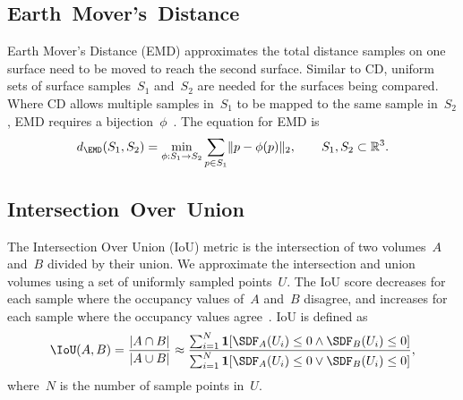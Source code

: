 \subsection{Earth~Mover's~Distance}
\label{subsec:earth_movers_distance}

Earth Mover's Distance (EMD) approximates the total distance samples on one surface need to be moved to reach the second surface. Similar to CD, uniform sets of surface samples~$S_1$ and~$S_2$ are needed for the surfaces being compared. Where CD allows multiple samples in~$S_1$ to be mapped to the same sample in~$S_2$, EMD requires a bijection~$\phi$~\cite{Fan2017, Achlioptas2018}. The equation for EMD is
\begin{equation*}
	d_{\EMD}(S_1, S_2) = \min_{\phi : S_1 \to S_2} \sum_{p \in S_1} \lVert p - \phi(p) \rVert_2, \qquad S_1, S_2 \subset \mathbb{R}^3.
\end{equation*}

\subsection{Intersection~Over~Union}
\label{subsec:intersection_over_union}

The Intersection Over Union (IoU) metric is the intersection of two volumes~$A$ and~$B$ divided by their union. We approximate the intersection and union volumes using a set of uniformly sampled points~$U$. The IoU score decreases for each sample where the occupancy values of~$A$ and~$B$ disagree, and increases for each sample where the occupancy values agree~\cite{Mescheder2019}. IoU is defined as
\begin{equation*}
	\IoU(A, B) = \frac{|A \cap B|}{|A \cup B|} \approx \frac{\sum_{i=1}^{N} \mathbf{1}[\SDF_A(U_i) \le 0 \wedge \SDF_B(U_i) \le 0]}{\sum_{i=1}^{N} \mathbf{1}[\SDF_A(U_i) \le 0 \vee \SDF_B(U_i) \le 0]},
\end{equation*}
where~$N$ is the number of sample points in~$U$.
